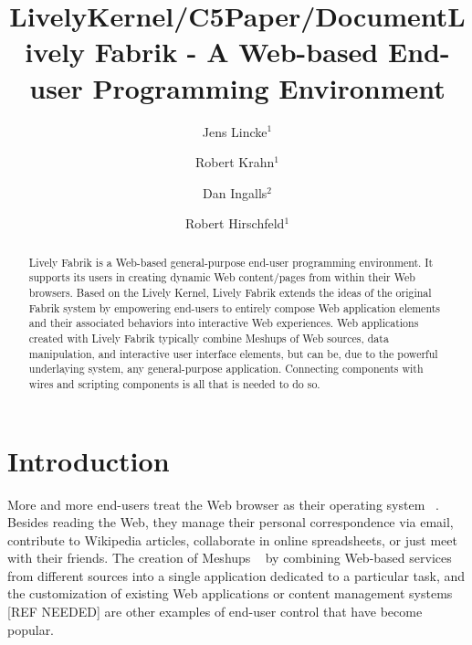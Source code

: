 \documentclass[pdftex, times, 10pt, twocolumn]{article}
\title{LivelyKernel/C5Paper/Document}
\author{ }
\date{ }
\begin{document}
\title{Lively Fabrik - A Web-based End-user Programming Environment}

\author{%
Jens Lincke$^1$  \\
\and
Robert Krahn$^1$\\
\and
Dan Ingalls$^2$\\
\and
Robert Hirschfeld$^1$\\
}


\maketitle
\thispagestyle{empty}


 

\begin{abstract} 

Lively Fabrik is a Web-based general-purpose end-user programming environment. It supports its users in creating dynamic Web content/pages from within their Web browsers. Based on the Lively Kernel, Lively Fabrik extends the ideas of the original Fabrik system by empowering end-users to entirely compose Web application elements and their associated behaviors into interactive Web experiences. Web applications created with Lively Fabrik typically combine Meshups of Web sources, data manipulation, and interactive user interface elements, but can be, due to the powerful underlaying system, any general-purpose application. Connecting components with wires and scripting components is all that is needed to do so. 

\end{abstract} 



\section{Introduction}
More and more end-users treat the Web browser as their operating system ~\cite{Taivalsaari2008TLKE}. Besides reading the Web, they manage their personal correspondence via email, contribute to Wikipedia articles, collaborate in online spreadsheets, or just meet with their friends. The creation of Meshups ~\cite{Merrill2006MNB} by combining Web-based services from different sources into a single application dedicated to a particular task, and the customization of existing Web applications or content management systems [REF NEEDED] are other examples of end-user control that have become popular.  
\end{document}
